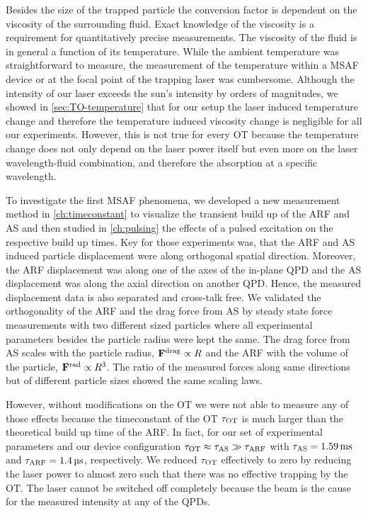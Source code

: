 Besides the size of the trapped particle the conversion factor is dependent on 
the viscosity of the surrounding fluid. Exact knowledge of the viscosity is a 
requirement for quantitatively precise measurements. The viscosity of the fluid 
is in general a function of its temperature. While the ambient temperature was 
straightforward to measure, the measurement of the temperature within a MSAF 
device or at the focal point of the trapping laser was cumbersome. Although the 
intensity of our laser exceeds the sun's intensity by orders of magnitudes, we 
showed in \cref{sec:TO-temperature} that for our setup the laser induced 
temperature change and therefore the temperature induced viscosity change is 
negligible for all our experiments. However, this is not true for every OT 
because the temperature change does not only depend on the laser power itself 
but even more on the laser wavelength-fluid combination, and therefore the 
absorption at a specific wavelength.

To investigate the first MSAF phenomena, we developed a new measurement method 
in \cref{ch:timeconstant} to visualize the transient build up of the ARF and AS 
and then studied in \cref{ch:pulsing} the effects of a pulsed excitation on the 
respective build up times. Key for those experiments was, that the ARF and AS 
induced particle displacement were along orthogonal spatial direction. 
Moreover, the ARF displacement was along one of the axes of the in-plane QPD 
and the AS displacement was along the axial direction on another QPD. Hence, 
the measured displacement data is also separated and cross-talk free. We 
validated the orthogonality of the ARF and the drag force from AS by steady 
state force measurements with two different sized particles where all 
experimental parameters besides the particle radius were kept the same. The 
drag force from AS scales with the particle radius, $\vb{F}^{\mathrm{drag}}\propto R$ and the ARF 
with the volume of the particle, $\vb{F}^{\mathrm{rad}}\propto R^{3}$. The ratio of the 
measured forces along same directions but of different particle sizes showed 
the same scaling laws. 

However, without modifications on the OT we were not able to measure any of 
those effects because the timeconstant of the OT $\tau_{\mathrm{OT}}$ is much larger than the 
theoretical build up time of the ARF. In fact, for our set of experimental 
parameters and our device configuration $\tau_{\mathrm{OT}} \approx \tau_{\mathrm{AS}} \gg \tau_{\mathrm{ARF}}$ with 
$\tas = \SI{1.59}{\ms}$ and $\tarf = \SI{1.4}{\us}$, respectively. We reduced 
$\tau_{\mathrm{OT}}$ effectively to zero by reducing the laser power to almost zero such that 
there was no effective trapping by the OT. The laser cannot be switched off 
completely because the beam is the cause for the measured intensity at any of 
the QPDs.

